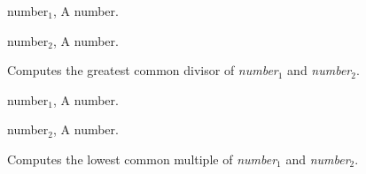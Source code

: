 \begin{optDefinition}
%
\begin{genericargs}
    \item[number$_1$, \classref{number}] A number.
    \item[number$_2$, \classref{number}] A number.
\end{genericargs}
%
\result%
Computes the greatest common divisor of {\em number$_1$} and {\em number$_2$}.

%
\begin{genericargs}
    \item[number$_1$, \classref{number}] A number.
    \item[number$_2$, \classref{number}] A number.
\end{genericargs}
%
\result%
Computes the lowest common multiple of {\em number$_1$} and {\em number$_2$}.
%
\end{optDefinition}
